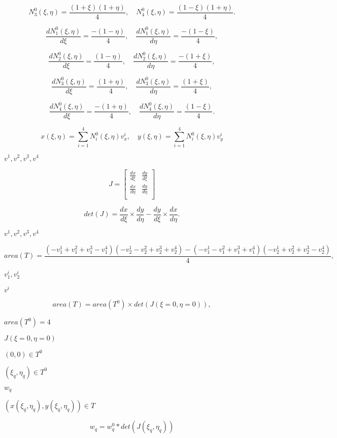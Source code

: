 \documentclass{article}
\begin{document}
\[
N^0_3(\xi, \eta) = \frac{(1+ \xi)(1 + \eta)}{4},\quad N^0_4(\xi, \eta) =
\frac{(1- \xi)(1 + \eta)}{4}. \]
\pagebreak

\[\frac{d N^0_1(\xi, \eta)}{d\xi} = \frac{-(1 - \eta)}{4}, \quad \frac{d
N^0_1(\xi, \eta)}{d\eta} = \frac{-(1 - \xi)}{4}, \]
\pagebreak

\[\frac{d N^0_2(\xi, \eta)}{d\xi} = \frac{(1 - \eta)}{4}, \quad \frac{d
N^0_2
(\xi, \eta)}{d\eta} = \frac{-(1 + \xi)}{4}, \]
\pagebreak

\[\frac{d N^0_3(\xi, \eta)}{d\xi} = \frac{(1 + \eta)}{4}, \quad \frac{d
N^0_3
(\xi, \eta)}{d\eta} = \frac{(1 + \xi)}{4}, \]
\pagebreak

\[\frac{d N^0_4(\xi, \eta)}{d\xi} = \frac{-(1 + \eta)}{4}, \quad \frac{d
N^0_4
(\xi, \eta)}{d\eta} = \frac{(1 - \xi)}{4}. \]
\pagebreak

\[ x(\xi, \eta) = \sum_{i=1}^4 N^0_i(\xi, \eta) v^i_x, \quad y(\xi, \eta)
= \sum_{i=1}^4 N^0_i(\xi, \eta) v^i_y \]
\pagebreak

$ v^1, v^2, v^3, v^4$
\pagebreak

\[ J = \left[ {
\begin{array}{cc}
\frac{dx}{d\xi} &\frac{dy}{d\xi} \\
\frac{dx}{d\eta} & \frac{dy}{d\eta} \\
\end{array}
} \right] \]
\pagebreak

\[ det(J) = \frac{dx}{d\xi} \times \frac{dy}{d\eta} -
\frac{dy}{d\xi}\times \frac{dx}{d\eta}. \]
\pagebreak

$ v^1, v^2, v^3, v^4 $
\pagebreak

\[ area(T) = \frac{(-v^1_1 + v^2_1 + v^3_1 - v^4_1) (-v^1_2 - v^2_2 +
v^3_2 + v^4_2) - (-v^1_1 - v^2_1 + v^3_1 + v^4_1) (-v^1_2 + v^2_2 + v^3_2
- v^4_2)}{4}, \]
\pagebreak

$ v^i_1, v^i_2 $
\pagebreak

$ v^i $
\pagebreak

\[ area(T) = area(T^0) \times det(J(\xi = 0, \eta = 0)), \]
\pagebreak

$ area(T^0) = 4 $
\pagebreak

$ J(\xi = 0, \eta = 0) $
\pagebreak

$ (0,0) \in T^0 $
\pagebreak

$ (\xi_q, \eta_q) \in T^0 $
\pagebreak

$
w_q $
\pagebreak

$ (x(\xi_q, \eta_q), y(\xi_q,
\eta_q)) \in T $
\pagebreak

\[ w_q = w^0_q * det(J(\xi_q, \eta_q)) \]
\pagebreak
\end{document}
